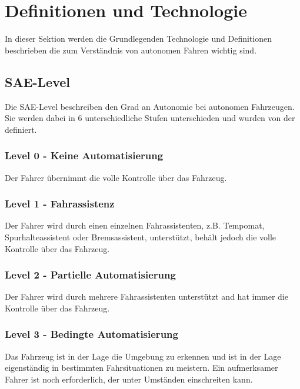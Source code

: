 

\section{Definitionen und Technologie}
\label{sec:definitionen-und-technologie}

In dieser Sektion werden die Grundlegenden Technologie und Definitionen beschrieben die zum Verständnis von autonomen Fahren wichtig sind.

\subsection{SAE-Level}
\label{ssec:sae-level}

Die SAE-Level \cite{standardSAE} beschreiben den Grad an Autonomie bei autonomen Fahrzeugen. Sie werden dabei in 6 unterschiedliche Stufen unterschieden und wurden von der \citeauthor{standardSAE} definiert.\\

\subsubsection*{Level 0 - Keine Automatisierung} Der Fahrer übernimmt die volle Kontrolle über das Fahrzeug.

\subsubsection*{Level 1 - Fahrassistenz} Der Fahrer wird durch einen einzelnen Fahrassistenten, z.B. Tempomat, Spurhalteassistent oder Bremsassistent, unterstützt, behält jedoch die volle Kontrolle über das Fahrzeug.

\subsubsection*{Level 2 - Partielle Automatisierung} Der Fahrer wird durch mehrere Fahrassistenten unterstützt and hat immer die Kontrolle über das Fahrzeug.
    
\subsubsection*{Level 3 - Bedingte Automatisierung} Das Fahrzeug ist in der Lage die Umgebung zu erkennen und ist in der Lage eigenständig in bestimmten Fahrsituationen zu meistern. Ein aufmerksamer Fahrer ist noch erforderlich, der unter Umständen einschreiten kann.

